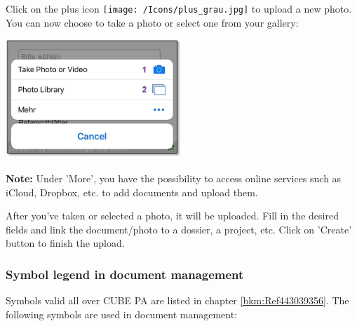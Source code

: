 Click on the plus icon \texttt{[image: /Icons/plus\_grau.jpg]} to upload a new photo. You can now choose to take a photo or select one from your gallery:

\vspace{\baselineskip}

\hspace{15mm} \includegraphics[height=45mm]{../chapters/11_Dokumentenablage/pictures/11-mob09_Foto_aufnehmen.jpg}

\vspace{\baselineskip}

\textbf{Note:} Under 'More', you have the possibility to access online services such as iCloud, Dropbox, etc. to add documents and upload them.

\vspace{\baselineskip}

After you've taken or selected a photo, it will be uploaded. Fill in the desired fields and link the document/photo to a dossier, a project, etc. Click on 'Create' button to finish the upload.



\pagebreak

\subsubsection{Symbol legend in document management}

Symbols valid all over CUBE PA are listed in chapter \ref{bkm:Ref443039356}. The following symbols are used in document management:

